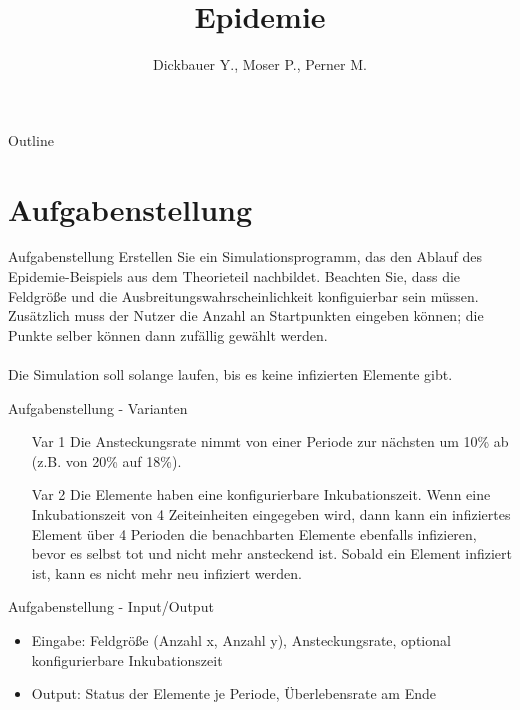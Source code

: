 

\title[BSP27 - Epidemie]{Epidemie}
\author{Dickbauer Y., Moser P., Perner M.}



\begin{frame}
  \titlepage
\end{frame}

\begin{frame}{Outline}
  \tableofcontents
\end{frame}

\section{Aufgabenstellung}
\begin{frame}{Aufgabenstellung}
Erstellen Sie ein Simulationsprogramm, das den Ablauf des Epidemie-Beispiels aus dem Theorieteil nachbildet. Beachten Sie, dass die Feldgröße und die Ausbreitungswahrscheinlichkeit konfiguierbar sein müssen. Zusätzlich muss der Nutzer die Anzahl an Startpunkten eingeben können; die Punkte selber können dann zufällig gewählt werden.
\\~\\
Die Simulation soll solange laufen, bis es keine infizierten Elemente gibt.
\end{frame}

\begin{frame}{Aufgabenstellung - Varianten}

\begin{itemize}
\item[Var 1] Die Ansteckungsrate nimmt von einer Periode zur nächsten um 10\% ab (z.B. von 20\% auf 18\%).
\vspace{.5cm}
\item[Var 2] Die Elemente haben eine konfigurierbare Inkubationszeit. Wenn eine Inkubationszeit von 4 Zeiteinheiten eingegeben wird, dann kann ein infiziertes Element über 4 Perioden die benachbarten Elemente ebenfalls infizieren, bevor es selbst tot und nicht mehr ansteckend ist. Sobald ein Element infiziert ist, kann es nicht mehr neu infiziert werden.
\end{itemize}

\end{frame}

\begin{frame}{Aufgabenstellung - Input/Output}

\begin{itemize}
  \item Eingabe: Feldgröße (Anzahl x, Anzahl y), Ansteckungsrate, optional konfigurierbare Inkubationszeit
  \vspace{1cm}
  \item Output: Status der Elemente je Periode, Überlebensrate am Ende
\end{itemize}
\end{frame}

